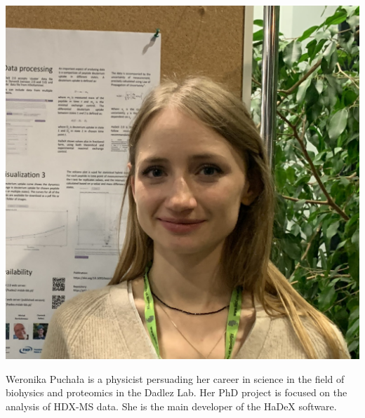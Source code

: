 \documentclass[]{MathAppl18}
\begin{document}
\begin{minipage}{0.2\textwidth}
        \includegraphics[width=1\textwidth]{Figures/weronika.png}
\end{minipage}
\hspace{0.01\textwidth}
\begin{minipage}{0.7\textwidth}
    Weronika Puchała is a physicist persuading her career in science in the field of biohysics and proteomics in the Dadlez Lab. Her PhD project is focused on the analysis of HDX-MS data. She is the main developer of the HaDeX software.
\end{minipage}
\end{document}

